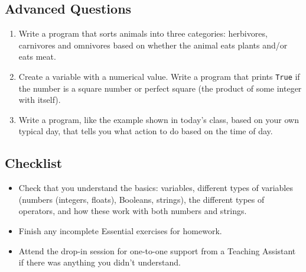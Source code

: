 \documentclass[12pt]{article}
\begin{document}
\begin{Exercise}[title=Logical Operators]

\ExeText{}
\end{Exercise}

\subsection*{Advanced Questions}

\begin{enumerate}[label=(\Alph*)]

    \item Write a program that sorts animals into three categories: herbivores, carnivores and omnivores based on whether the animal eats plants and/or eats meat.
    
    \item Create a variable with a numerical value. Write a program that prints {\tt True} if the number is a square number or perfect square (the product of some integer with itself).
    
    
    \item Write a program, like the example shown in today's class, based on your own typical day, that tells you what action to do based on the time of day.   
    
\end{enumerate}





\subsection*{Checklist}
\begin{itemize}
	\item Check that you understand the basics: variables, different types of variables (numbers (integers, floats), Booleans, strings), the different types of operators, and how these work with both numbers and strings.
	\item Finish any incomplete Essential exercises for homework. 
	\item Attend the drop-in session for one-to-one support from a Teaching Assistant if there was anything you didn't understand.
\end{itemize}
\end{document}
